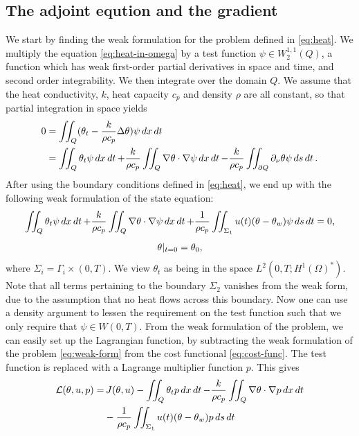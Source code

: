 \subsection{The adjoint eqution and the gradient}
We start by finding the weak formulation for the problem defined in \eqref{eq:heat}. We multiply the equation \eqref{eq:heat-in-omega} by a test function $\psi\in W_2^{1,1}(Q)$, a function which has weak first-order partial derivatives in space and time, and second order integrability. We then integrate over the domain $Q$. We assume that the heat conductivity, $k$, heat capacity $c_p$ and density $\rho$ are all constant, so that partial integration in space yields 
\begin{equation}
\begin{aligned}
  0 &= \iint_Q (\theta_t - \frac{k}{\rho c_p}\Delta\theta)\psi\mathop{dx}\mathop{dt}  \\
  &= \iint_Q \theta_t\psi\mathop{dx}\mathop{dt} + \frac{k}{\rho c_p}\iint_Q\nabla\theta \cdot \nabla\psi\mathop{dx}\mathop{dt} - \frac{k}{\rho c_p}\iint_{\partial Q}\partial_\nu\theta\psi\mathop{ds}\mathop{dt}.
\end{aligned}
\end{equation}
After using the boundary conditions defined in \eqref{eq:heat}, we end up with the following weak formulation of the state equation:
\begin{equation}\label{eq:weak-form}
  \begin{gathered}
  \iint_Q \theta_t\psi\mathop{dx}\mathop{dt} + \frac{k}{\rho c_p}\iint_Q\nabla\theta \cdot \nabla\psi\mathop{dx}\mathop{dt} + \frac{1}{\rho c_p}\iint_{\Sigma_1} u(t)(\theta - \theta_w)\psi\mathop{ds}\mathop{dt} = 0,\\[1ex]
  \theta|_{t=0} = \theta_0,
  \end{gathered}
\end{equation}
where $\Sigma_i = \Gamma_i\times(0,T)$. We view $\theta_t$ as being in the space $ L^2(0,T;H^1(\Omega)^{*})$. Note that all terms pertaining to the boundary $\Sigma_2$ vanishes from the weak form, due to the assumption that no heat flows across this boundary. Now one can use a density argument to lessen the requirement on the test function such that we only require that $\psi \in W(0,T)$.
From the weak formulation of the problem, we can easily set up the Lagrangian function, by subtracting the weak formulation of the problem \eqref{eq:weak-form} from the cost functional \eqref{eq:cost-func}. The test function is replaced with a Lagrange multiplier function $p$. This gives
\begin{equation}
  \begin{aligned}\label{eq:lagrangian-raw}
  \mathcal{L}(\theta, u, p) = &\,J(\theta, u) - \iint_Q \theta_t p\mathop{dx}\mathop{dt} - \frac{k}{\rho c_p}\iint_Q\nabla\theta \cdot \nabla p \mathop{dx}\mathop{dt} \\
  &- \frac{1}{\rho c_p}\iint_{\Sigma_1} u(t)(\theta - \theta_w)p \mathop{ds}\mathop{dt}
  \end{aligned}
\end{equation}
